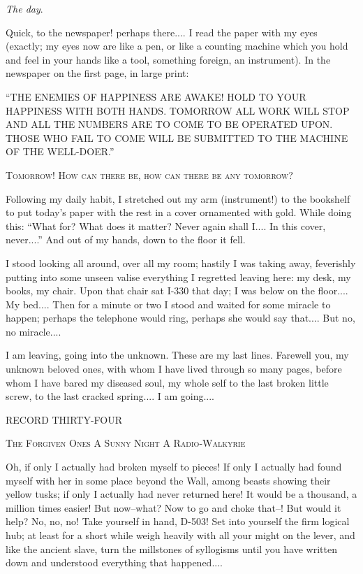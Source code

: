 \documentclass[11pt,openany]{book}
\begin{document}
\emph{The day}.

Quick, to the newspaper! perhaps there.... I read the paper with my eyes (exactly; my eyes now are like a pen, or like a counting machine which you hold and feel in your hands like a tool, something foreign, an instrument). In the newspaper on the first page, in large print:

``THE ENEMIES OF HAPPINESS ARE AWAKE! HOLD TO YOUR HAPPINESS WITH BOTH HANDS. TOMORROW ALL WORK WILL STOP AND ALL THE NUMBERS ARE TO COME TO BE OPERATED UPON. THOSE WHO FAIL TO COME WILL BE SUBMITTED TO THE MACHINE OF THE WELL-DOER.''

\begin{center}\textsc{Tomorrow! How can there be, how can there be any tomorrow?}\end{center}

Following my daily habit, I stretched out my arm (instrument!) to the bookshelf to put today's paper with the rest in a cover ornamented with gold. While doing this: ``What for? What does it matter? Never again shall I.... In this cover, never....'' And out of my hands, down to the floor it fell.

I stood looking all around, over all my room; hastily I was taking away, feverishly putting into some unseen valise everything I regretted leaving here: my desk, my books, my chair. Upon that chair sat I-330 that day; I was below on the floor.... My bed.... Then for a minute or two I stood and waited for some miracle to happen; perhaps the telephone would ring, perhaps she would say that.... But no, no miracle....

I am leaving, going into the unknown. These are my last lines. Farewell you, my unknown beloved ones, with whom I have lived through so many pages, before whom I have bared my diseased soul, my whole self to the last broken little screw, to the last cracked spring.... I am going....

\begin{center}\textsc{RECORD THIRTY-FOUR}\end{center}

\begin{center}\textsc{The Forgiven Ones A Sunny Night A Radio-Walkyrie}\end{center}

Oh, if only I actually had broken myself to pieces! If only I actually had found myself with her in some place beyond the Wall, among beasts showing their yellow tusks; if only I actually had never returned here! It would be a thousand, a million times easier! But now--what? Now to go and choke that--! But would it help? No, no, no! Take yourself in hand, D-503! Set into yourself the firm logical hub; at least for a short while weigh heavily with all your might on the lever, and like the ancient slave, turn the millstones of syllogisms until you have written down and understood everything that happened....
\end{document}
